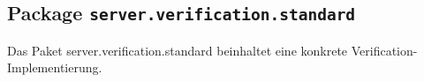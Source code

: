 \FloatBarrier
\subsection[Package server.verification.standard]{Package \texttt{server.verification.standard}}
Das Paket server.verification.standard beinhaltet eine konkrete Verification-Implementierung.